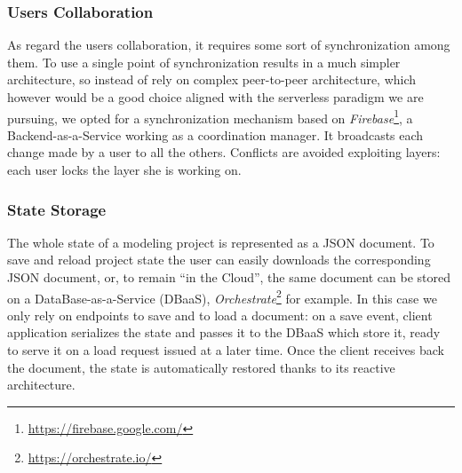 \subsubsection*{Users Collaboration}

As regard the users collaboration, it requires some sort of synchronization among them. To use a single point of synchronization results in a much simpler architecture, so instead of rely on complex peer-to-peer architecture, which however would be a good choice aligned with the serverless paradigm we are pursuing, we opted for a synchronization mechanism based on \emph{Firebase}\footnote{\url{https://firebase.google.com/}}, a Backend-as-a-Service working as a coordination manager. It broadcasts each change made by a user to all the others. Conflicts are avoided exploiting layers: each user locks the layer she is working on.

\subsubsection*{State Storage}


The whole state of a modeling project is represented as a JSON document. To save and reload project state the user can easily downloads the corresponding JSON document, or, to remain ``in the Cloud'', the same document can be stored on a DataBase-as-a-Service (DBaaS), \emph{Orchestrate}\footnote{\url{https://orchestrate.io/}} for example. In this case we only rely on endpoints to save and to load a document: on a save event,  client application serializes the state and passes it to the DBaaS which store it, ready to serve it on a load request issued at a later time. Once the client receives back the document, the state is automatically restored thanks to its reactive architecture.


